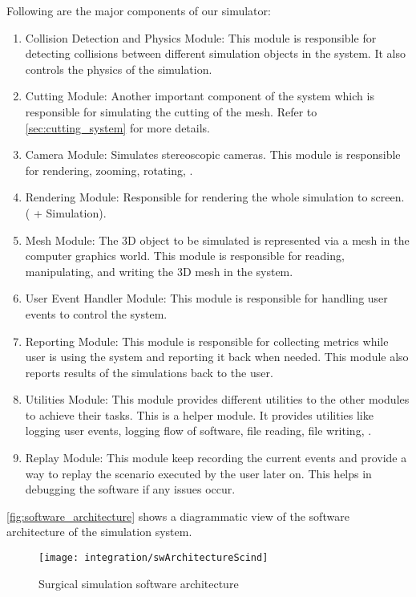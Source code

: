 Following are the major components of our simulator:
\begin{enumerate}
  \item Collision Detection and Physics Module: This module is responsible for detecting collisions between different simulation objects in the system. It also controls the  physics of the simulation.
  \item Cutting Module: Another important component of the system which is responsible for simulating the cutting of the mesh. Refer to \autoref{sec:cutting_system} for more details.
  \item Camera Module: Simulates stereoscopic cameras. This module is responsible for rendering, zooming, rotating, \etc.
  \item Rendering Module: Responsible for rendering the whole simulation to screen. ( + Simulation).
  \item Mesh Module: The 3D object to be simulated is represented via a mesh in the computer graphics world. This module is responsible for reading, manipulating, and writing the 3D mesh in the system.
  \item User Event Handler Module: This module is responsible for handling user events to control the system.
  \item Reporting Module: This module is responsible for collecting metrics while user is using the system and reporting it back when needed. This module also reports results of the simulations back to the user.
  \item Utilities Module: This module provides different utilities to the other modules to achieve their tasks. This is a helper module. It provides utilities like logging user events, logging flow of software, file reading, file writing, \etc.
  \item Replay Module: This module keep recording the current events and provide a way to replay the scenario executed by the user later on. This helps in debugging the software if any issues occur.
\end{enumerate}

\autoref{fig:software_architecture} shows a diagrammatic view of the software architecture of the simulation system.
\begin{sidewaysfigure}
  \centering
  \texttt{[image: integration/swArchitectureScind]}
  \caption{Surgical simulation software architecture}
  \label{fig:software_architecture}
\end{sidewaysfigure}

